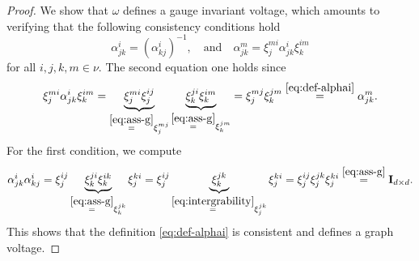 \documentclass[10pt,a4paper]{amsart}
\newcommand{\II}{\mathbf{I}_{d \times d}}
\begin{document}
	\begin{proof}
		We show that $\omega$ defines a gauge invariant voltage, which amounts to verifying that the following consistency conditions hold
		\begin{equation}
			\alpha_{jk}^{i} = (\alpha_{kj}^{i})^{-1}, \quad \text{and} \quad
			\alpha_{jk}^{m} = \xi^{mi}_{j} \alpha^{i}_{jk} \xi^{im}_{k}
		\end{equation}
		for all $i,j,k,m \in \nu$. The second equation one holds since
		\begin{equation}
			\xi^{mi}_{j} \alpha^{i}_{jk} \xi^{im}_{k}
			=
			\underbrace{\xi^{mi}_{j} \xi^{ij}_{j}}_{\overset{\eqref{eq:ass-g}}{=}\xi^{mj}_{j}}
			\underbrace{\xi^{ji}_{k} \xi^{im}_{k}}_{\overset{\eqref{eq:ass-g}}{=}\xi^{jm}_{k}}
			= \xi^{mj}_{j} \xi^{jm}_{k}
			\overset{\eqref{eq:def-alphai}}{=} \alpha^{m}_{jk}.
		\end{equation}
		For the first condition, we compute
		\begin{equation}
			\alpha^{i}_{jk}\alpha^{i}_{kj}
			=
			\xi^{ij}_{j}
			\underbrace{
				\xi^{ji}_{k}\xi^{ik}_{k}
			}_{\overset{\eqref{eq:ass-g}}{=} \xi^{jk}_{k}}
			\xi^{ki}_{j}
			=
			\xi^{ij}_{j}
			\underbrace{
				\xi^{jk}_{k}
			}_{\overset{\eqref{eq:intergrability}}{=} \xi^{jk}_{j}}
			\xi^{ki}_{j}
			=
			\xi^{ij}_{j}\xi^{jk}_{j}\xi^{ki}_{j}
			\overset{\eqref{eq:ass-g}}{=}
			\II.
		\end{equation}
		This shows that the definition \eqref{eq:def-alphai} is consistent and defines a graph voltage.


\end{proof}
\end{document}
